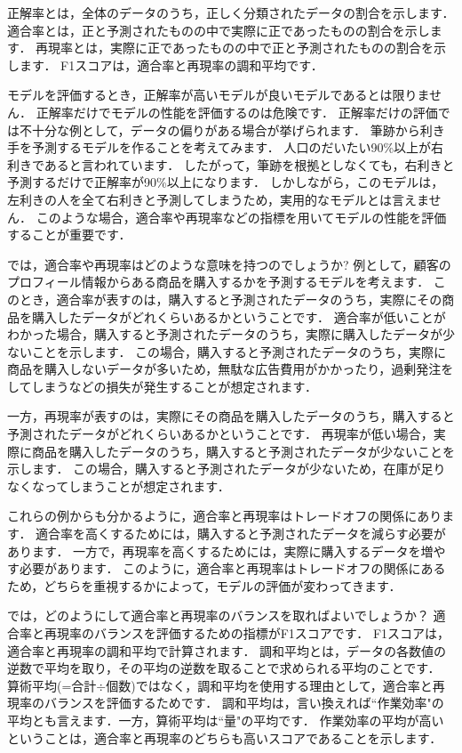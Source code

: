 \documentclass{jarticle}
\begin{document}
正解率とは，全体のデータのうち，正しく分類されたデータの割合を示します．
適合率とは，正と予測されたものの中で実際に正であったものの割合を示します．
再現率とは，実際に正であったものの中で正と予測されたものの割合を示します．
F1スコアは，適合率と再現率の調和平均です．

モデルを評価するとき，正解率が高いモデルが良いモデルであるとは限りません．
正解率だけでモデルの性能を評価するのは危険です．
正解率だけの評価では不十分な例として，データの偏りがある場合が挙げられます．
筆跡から利き手を予測するモデルを作ることを考えてみます．
人口のだいたい90\%以上が右利きであると言われています．
したがって，筆跡を根拠としなくても，右利きと予測するだけで正解率が90\%以上になります．
しかしながら，このモデルは，左利きの人を全て右利きと予測してしまうため，実用的なモデルとは言えません．
このような場合，適合率や再現率などの指標を用いてモデルの性能を評価することが重要です．

では，適合率や再現率はどのような意味を持つのでしょうか?
例として，顧客のプロフィール情報からある商品を購入するかを予測するモデルを考えます．
このとき，適合率が表すのは，購入すると予測されたデータのうち，実際にその商品を購入したデータがどれくらいあるかということです．
適合率が低いことがわかった場合，購入すると予測されたデータのうち，実際に購入したデータが少ないことを示します．
この場合，購入すると予測されたデータのうち，実際に商品を購入しないデータが多いため，無駄な広告費用がかかったり，過剰発注をしてしまうなどの損失が発生することが想定されます．

一方，再現率が表すのは，実際にその商品を購入したデータのうち，購入すると予測されたデータがどれくらいあるかということです．
再現率が低い場合，実際に商品を購入したデータのうち，購入すると予測されたデータが少ないことを示します．
この場合，購入すると予測されたデータが少ないため，在庫が足りなくなってしまうことが想定されます．

これらの例からも分かるように，適合率と再現率はトレードオフの関係にあります．
適合率を高くするためには，購入すると予測されたデータを減らす必要があります．
一方で，再現率を高くするためには，実際に購入するデータを増やす必要があります．
このように，適合率と再現率はトレードオフの関係にあるため，どちらを重視するかによって，モデルの評価が変わってきます．

では，どのようにして適合率と再現率のバランスを取ればよいでしょうか？
適合率と再現率のバランスを評価するための指標がF1スコアです．
F1スコアは，適合率と再現率の調和平均で計算されます．
調和平均とは，データの各数値の逆数で平均を取り，その平均の逆数を取ることで求められる平均のことです．
算術平均(=合計$\div$個数)ではなく，調和平均を使用する理由として，適合率と再現率のバランスを評価するためです．
調和平均は，言い換えれば``作業効率"の平均とも言えます．一方，算術平均は``量"の平均です．
作業効率の平均が高いということは，適合率と再現率のどちらも高いスコアであることを示します．
\end{document}
